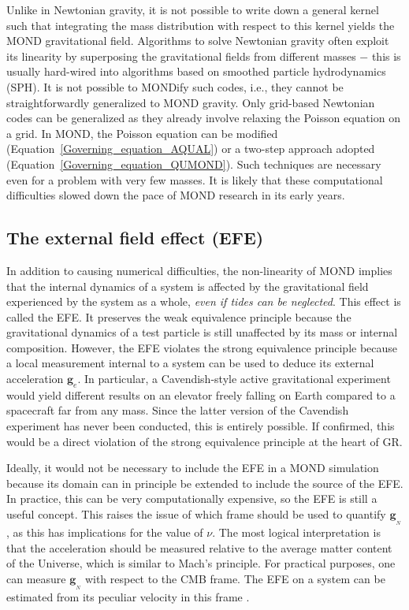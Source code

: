 \documentclass[fleqn,usenatbib,useAMS]{mnras} %
\begin{document}
Unlike in Newtonian gravity, it is not possible to write down a general kernel such that integrating the mass distribution with respect to this kernel yields the MOND gravitational field. Algorithms to solve Newtonian gravity often exploit its linearity by superposing the gravitational fields from different masses $-$ this is usually hard-wired into algorithms based on smoothed particle hydrodynamics (SPH). It is not possible to MONDify such codes, i.e., they cannot be straightforwardly generalized to MOND gravity. Only grid-based Newtonian codes can be generalized as they already involve relaxing the Poisson equation on a grid. In MOND, the Poisson equation can be modified (Equation~\ref{Governing_equation_AQUAL}) or a two-step approach adopted (Equation~\ref{Governing_equation_QUMOND}). Such techniques are necessary even for a problem with very few masses. It is likely that these computational difficulties slowed down the pace of MOND research in its early years.



\subsection{The external field effect (EFE)}
\label{EFE_theory}

In addition to causing numerical difficulties, the non-linearity of MOND implies that the internal dynamics of a system is affected by the gravitational field experienced by the system as a whole, \emph{even if tides can be neglected}. This effect is called the EFE. It preserves the weak equivalence principle because the gravitational dynamics of a test particle is still unaffected by its mass or internal composition. However, the EFE violates the strong equivalence principle because a local measurement internal to a system can be used to deduce its external acceleration $\bm{g}_e$. In particular, a Cavendish-style active gravitational experiment would yield different results on an elevator freely falling on Earth compared to a spacecraft far from any mass. Since the latter version of the Cavendish experiment has never been conducted, this is entirely possible. If confirmed, this would be a direct violation of the strong equivalence principle at the heart of GR.

Ideally, it would not be necessary to include the EFE in a MOND simulation because its domain can in principle be extended to include the source of the EFE. In practice, this can be very computationally expensive, so the EFE is still a useful concept. This raises the issue of which frame should be used to quantify $\bm{g}_{_N}$, as this has implications for the value of $\nu$. The most logical interpretation is that the acceleration should be measured relative to the average matter content of the Universe, which is similar to Mach's principle. For practical purposes, one can measure $\bm{g}_{_N}$ with respect to the CMB frame. The EFE on a system can be estimated from its peculiar velocity in this frame \citep{Famaey_2007, Banik_Ryan_2018}.
\end{document}
